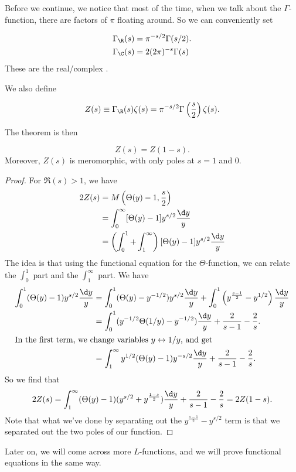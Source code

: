 \documentclass[a4paper]{article}
\begin{document}
Before we continue, we notice that most of the time, when we talk about the $\Gamma$-function, there are factors of $\pi$ floating around. So we can conveniently set
\begin{notation}
  \begin{align*}
    \Gamma_\R(s) &= \pi^{-s/2} \Gamma(s/2).\\
    \Gamma_\C(s) &= 2 (2\pi)^{-s} \Gamma(s)
  \end{align*}
  These are the real/complex .
\end{notation}

We also define
\begin{notation}
  \[
    Z(s) \equiv \Gamma_\R(s) \zeta(s) = \pi^{-s/2} \Gamma\left(\frac{s}{2}\right) \zeta(s).
  \]
\end{notation}
The theorem is then
\begin{thm}
  \[
    Z(s) = Z(1 - s).
  \]
  Moreover, $Z(s)$ is meromorphic, with only poles at $s = 1$ and $0$.
\end{thm}

\begin{proof}
  For $\Re(s) > 1$, we have
  \begin{align*}
    2Z(s) &= M\left(\Theta(y) - 1, \frac{s}{2}\right) \\
    &= \int_0^\infty [\Theta(y) - 1] y^{s/2} \frac{\d y}{y}\\
    &= \left(\int_0^1 + \int_1^\infty\right)[\Theta(y) - 1] y^{s/2} \frac{\d y}{y}
  \end{align*}
  The idea is that using the functional equation for the $\Theta$-function, we can relate the $\int_0^1$ part and the $\int_1^\infty$ part. We have
  \begin{align*}
    \int_0^1 (\Theta(y) - 1) y^{s/2} \frac{\d y}{y} &= \int_0^1 (\Theta(y) - y^{-1/2}) y^{s/2} \frac{\d y}{y} + \int_0^1 \left(y^{\frac{s - 1}{2}} - y^{1/2}\right) \frac{\d y}{y}\\
    &= \int_0^1 (y^{-1/2} \Theta(1/y) - y^{-1/2}) \frac{\d y}{y} + \frac{2}{s - 1} - \frac{2}{s}.\\
    \intertext{In the first term, we change variables $y \leftrightarrow 1/y$, and get}
    &= \int_1^\infty y^{1/2} (\Theta(y) - 1) y^{-s/2} \frac{\d y}{y} + \frac{2}{s - 1} - \frac{2}{s}.
  \end{align*}
  So we find that
  \[
    2Z(s) = \int_1^\infty (\Theta(y) - 1)(y^{s/2} + y^{\frac{1 - s}{2}}) \frac{\d y}{y} + \frac{2}{s - 1} - \frac{2}{s} = 2Z(1 - s).
  \]
  Note that what we've done by separating out the $y^{\frac{s - 1}{2}} - y^{s/2}$ term is that we separated out the two poles of our function.
\end{proof}
Later on, we will come across more $L$-functions, and we will prove functional equations in the same way.
\end{document}
